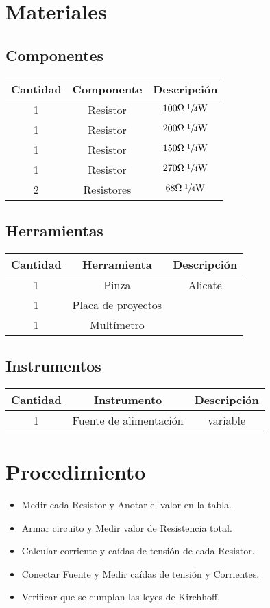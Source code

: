 \documentclass[12pt,a4paper,oneside]{article}
\begin{document}
\section{Materiales}
\subsection{Componentes}
\begin{center}
\begin{tabular}{c c c}
 Cantidad &Componente &Descripción \\
 \hline
 1&Resistor &$100\unit{\ohm} \;  \sfrac{1}{4}\unit{\watt}$ \\
 1&Resistor &$200\unit{\ohm} \;  \sfrac{1}{4}\unit{\watt}$ \\
 1&Resistor &$150\unit{\ohm} \;  \sfrac{1}{4}\unit{\watt}$ \\
 1&Resistor &$270\unit{\ohm} \;  \sfrac{1}{4}\unit{\watt}$ \\
 2&Resistores &$68\unit{\ohm}\;  \sfrac{1}{4}\unit{\watt}$ 
\end{tabular}
\end{center}
\subsection{Herramientas}
\begin{center}
  \begin{tabular}{c c c}
    Cantidad &Herramienta &Descripción\\ 
    \hline
    1 &Pinza &Alicate \\
    1 &Placa de proyectos \\
    1 &Multímetro
\end{tabular}
\end{center}
\subsection{Instrumentos}
\begin{center}
  \begin{tabular}{c c c}
    Cantidad &Instrumento &Descripción\\ 
    \hline
    1 &Fuente de alimentación &variable
\end{tabular}
\end{center}
\section{Procedimiento}
\begin{itemize}
    \item Medir cada Resistor y Anotar el valor en la tabla. \\
    \item Armar circuito y Medir valor de Resistencia total. \\
    \item Calcular corriente y caídas de tensión de cada Resistor. \\
    \item Conectar Fuente y Medir caídas de tensión y Corrientes. \\
    \item Verificar que se cumplan las leyes de Kirchhoff. 
\end{itemize}
\end{document}
